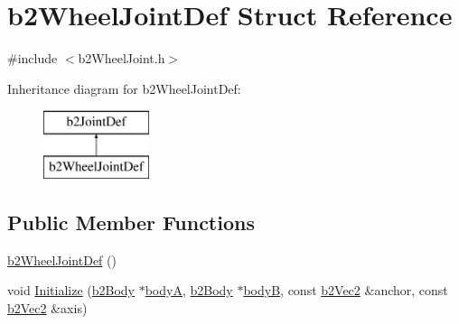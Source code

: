\hypertarget{structb2_wheel_joint_def}{}\section{b2\+Wheel\+Joint\+Def Struct Reference}
\label{structb2_wheel_joint_def}


{\ttfamily \#include $<$b2\+Wheel\+Joint.\+h$>$}

Inheritance diagram for b2\+Wheel\+Joint\+Def\+:\begin{figure}[H]
\begin{center}
\leavevmode
\includegraphics[height=2.000000cm]{structb2_wheel_joint_def}
\end{center}
\end{figure}
\subsection*{Public Member Functions}
\begin{DoxyCompactItemize}
\item 
\mbox{\hyperlink{structb2_wheel_joint_def_a3da0f9e8e69eb228c6b24b851802da88}{b2\+Wheel\+Joint\+Def}} ()
\item 
void \mbox{\hyperlink{structb2_wheel_joint_def_af26887092d36c3cd03898401a38783e2}{Initialize}} (\mbox{\hyperlink{classb2_body}{b2\+Body}} $\ast$\mbox{\hyperlink{structb2_joint_def_a8cd54c93da396be75a9788f2c6897f05}{bodyA}}, \mbox{\hyperlink{classb2_body}{b2\+Body}} $\ast$\mbox{\hyperlink{structb2_joint_def_aa4f4dee2fbcd12187b19506b60e68e3d}{bodyB}}, const \mbox{\hyperlink{structb2_vec2}{b2\+Vec2}} \&anchor, const \mbox{\hyperlink{structb2_vec2}{b2\+Vec2}} \&axis)
\end{DoxyCompactItemize}
